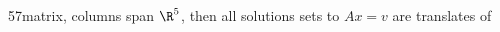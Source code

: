 




\endedxtext

\endedxvertical






% 







5\times 7matrix, columns span $\R^5$, then all solutions sets to $Ax= v$ are translates of 

\endedxvertical






